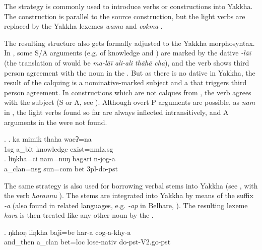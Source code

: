  The  strategy is commonly used to introduce  verbs or  constructions into Yakkha. The construction is parallel to the  source construction, but the  light verbs are replaced by the Yakkha lexemes \emph{wama}  and \emph{cokma} . 
 
 The resulting structure also gets formally adjusted to the Yakkha morphosyntax. In , some S/A arguments  (e.g. of knowledge and ) are marked by the dative \emph{-lāī} (the  translation of \Next[a] would be \emph{ma-lāī ali-ali thāhā cha}), and the verb shows third person agreement with the noun in the . But as there is no dative  in Yakkha, the result of the calquing is a nominative-marked subject and a  that triggers third person agreement. In  constructions which are not calques from , the verb agrees with the subject (S or A, see \Next[b]). Although overt P arguments are possible, as \emph{nam}   in \Next[b], the light verbs found so far are always inflected intransitively, and A arguments in the   were not found.

\ex. \ag. ka mimik   thaha       waeʔ=na\\
		{\sc 1sg} a\_bit knowledge exist{\sc [3sg]=nmlz.sg}\\
	  
	\bg. liŋkha=ci     nam=nuŋ      bʌgʌri n-jog-a\\
	a\_clan{\sc =nsg} sun{\sc =com} bet {\sc 3pl-}do{\sc -pst}\\
	 

	
The same strategy  is also used for borrowing  verbal stems into Yakkha (see \Next, with the  verb \emph{haraunu} ). The  stems are integrated into Yakkha by means of the suffix \emph{-a} (also found in related languages, e.g. \emph{-ap} in Belhare, \citealt[559]{Bickel2003Belhare}). The resulting lexeme \emph{hara} is then treated like any other noun by the .

\exg. ŋkhoŋ    liŋkha   baji=be    har-a cog-a-khy-a\\
and\_then a\_clan bet{\sc =loc} lose{\sc -nativ} do{\sc [3sg]-pst-V2.go-pst}    \\


